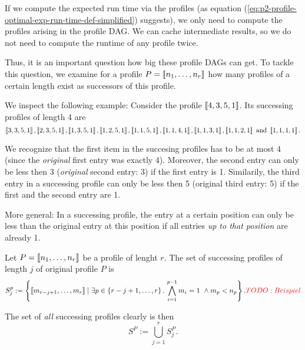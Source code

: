 If we compute the expected run time via the profiles (as equation (\ref{eq:p2-profile-optimal-exp-run-time-def-simplified}) suggests), we only need to compute the profiles arising in the profile DAG. We can cache intermediate results, so we do not need to compute the runtime of any profile twice.

Thus, it is an important question how big these profile DAGs can get. To tackle this question, we examine for a profile $P=\left\llbracket n_1,\dots,n_r \right\rrbracket$ how many profiles of a certain length exist as successors of this profile.

We inspect the following example: Consider the profile $\left\llbracket 4,3,5,1 \right\rrbracket$. Its successing profiles of length 4 are
\begin{equation*}
  \left\llbracket 3, 3, 5, 1 \right\rrbracket,
  \left\llbracket 2, 3, 5, 1 \right\rrbracket,
  \left\llbracket 1, 3, 5, 1 \right\rrbracket,
  \left\llbracket 1, 2, 5, 1 \right\rrbracket,
  \left\llbracket 1, 1, 5, 1 \right\rrbracket,
  \left\llbracket 1, 1, 4, 1 \right\rrbracket,
  \left\llbracket 1, 1, 3, 1 \right\rrbracket,
  \left\llbracket 1, 1, 2, 1 \right\rrbracket \text{ and }
  \left\llbracket 1, 1, 1, 1 \right\rrbracket.
\end{equation*}

We recognize that the first item in the succesing profiles has to be at most 4 (since the \emph{original} first entry was exactly 4). Moreover, the second entry can only be less then 3 (\emph{original} second entry: 3) if the first entry is 1. Similarily, the third entry in a successing profile can only be less then 5 (original third entry: 5) if the first and the second entry are 1.

More general: In a successing profile, the entry at a certain position can only be less than the original entry at this position if all entries \emph{up to that position} are already 1.

\begin{definition}
Let $P=\left\llbracket n_1,\dots,n_r \right\rrbracket$ be a profile of lenght $r$. The set of successing profiles of length $j$ of original profile $P$ is
\begin{equation*}
  S^p_{j}
  :=
  \left\{ 
    \profile{m_{r-j+1},\dots,m_{r}}
    \mid
    \exists p \in \left\{ r-j+1,\dots,r \right\}.\,
    \bigwedge_{i=1}^{p-1} m_i = 1 \ \wedge m_p < n_p
  \right\}.
  \todo{Beispiel}
\end{equation*}

The set of \emph{all} successing profiles clearly is then
\begin{equation*}
  S^P
  :=
  \bigcup_{j=1}^r S^P_j.
\end{equation*}
\end{definition}

